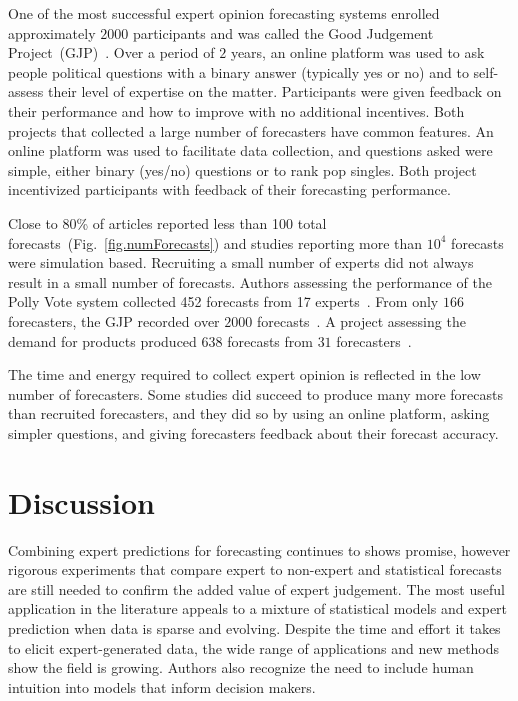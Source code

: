 \documentclass[preprint]{elsarticle}
\begin{document}
One of the most successful expert opinion forecasting systems enrolled approximately $2000$ participants and was called the Good Judgement Project~(GJP)~\cite{mellers2014psychological,ungar2012good,satopaa2014probability}.
Over a period of $2$ years, an online platform was used to ask people political questions with a binary answer (typically yes or no) and to self-assess their level of expertise on the matter.
Participants were given feedback on their performance and how to improve with no additional incentives.
Both projects that collected a large number of forecasters have common features.
An online platform was used to facilitate data collection, and questions asked were simple, either binary (yes/no) questions or to rank pop singles. 
Both project incentivized participants with feedback of their forecasting performance.

Close to 80\% of articles reported less than 100 total forecasts~(Fig.~\ref{fig.numForecasts}) and studies reporting more than $10^4$ forecasts were simulation based.
Recruiting a small number of experts did not always result in a small number of forecasts.
Authors assessing the performance of the Polly Vote system collected 452 forecasts from 17 experts~\cite{graefe2014accuracy,graefe2015accuracy,graefe2018predicting}.
From only $166$ forecasters, the GJP recorded over $2000$ forecasts~\cite{mellers2014psychological,ungar2012good}.
A project assessing the demand for products produced $638$ forecasts from $31$ forecasters~\cite{alvarado2017expertise}.

The time and energy required to collect expert opinion is reflected in the low number of forecasters. 
Some studies did succeed to produce many more forecasts than recruited forecasters, and they did so by using an online platform, asking simpler questions, and giving forecasters feedback about their forecast accuracy.

\section{Discussion}


\label{sec.discussion}

Combining expert predictions for forecasting continues to shows promise, however rigorous experiments that compare expert to non-expert and statistical forecasts are still needed to confirm the added value of expert judgement.
The most useful application in the literature appeals to a mixture of statistical models and expert prediction when data is sparse and evolving.
Despite the time and effort it takes to elicit expert-generated data, the wide range of applications and new methods show the field is growing.
Authors also recognize the need to include human intuition into models that inform decision makers.
\end{document}
